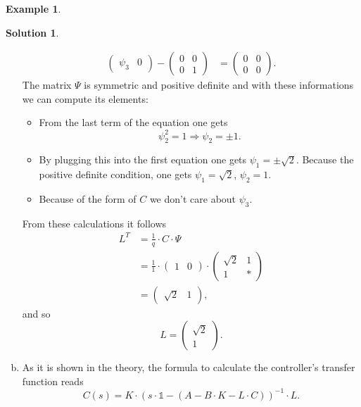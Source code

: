 \documentclass[a4paper,12 pt]{article}
\numberwithin{equation}{section}
\theoremstyle{definition}
\newtheorem{bsp}{Example}
\theoremstyle{remark}
\theoremstyle{definition}
\newtheorem*{lsg}{Solution}
\theoremstyle{definition}
\theoremstyle{definition}
\theoremstyle{remark}
\begin{document}
\begin{bsp}
\begin{lsg}
\begin{enumerate}[(a)]
\begin{equation*}
\begin{split}
\begin{pmatrix}
\psi_3 &0
\end{pmatrix}-\begin{pmatrix}
0&0\\ 0&1
\end{pmatrix}&=\begin{pmatrix}
0&0\\ 0&0 
\end{pmatrix}.
\end{split}
\end{equation*}
The matrix $\Psi$ is symmetric and positive definite and with these informations we can compute its elements:
\begin{itemize}
\item From the last term of the equation one gets
\begin{equation*}
\psi_2^2=1 \Rightarrow \psi_2=\pm 1.
\end{equation*}
\item By plugging this into the first equation one gets $\psi_1=\pm \sqrt{2}$. Because the positive definite condition, one gets $\psi_1=\sqrt{2}$, $\psi_2=1$.
\item Because of the form of $C$ we don't care about $\psi_3$.
\end{itemize}
From these calculations it follows
\begin{equation*}
\begin{split}
L^T&=\frac{1}{q}\cdot C \cdot \Psi\\
&=\frac{1}{1}\cdot \begin{pmatrix} 1&0 \end{pmatrix} \cdot \begin{pmatrix}
\sqrt{2}&1\\
1&*
\end{pmatrix}\\
&=\begin{pmatrix}
\sqrt{2}&1
\end{pmatrix},
\end{split}
\end{equation*}
and so
\begin{equation*}
L=\begin{pmatrix} \sqrt{2}\\ 1\end{pmatrix}.
\end{equation*}
\item As it is shown in the theory, the formula to calculate the controller's transfer function reads
\begin{equation*}
C(s)=K\cdot (s\cdot \mathbb{1}-(A-B\cdot K -L\cdot C))^{-1}\cdot L.

\end{equation*}
\end{enumerate}
\end{lsg}
\end{bsp}
\end{document}
